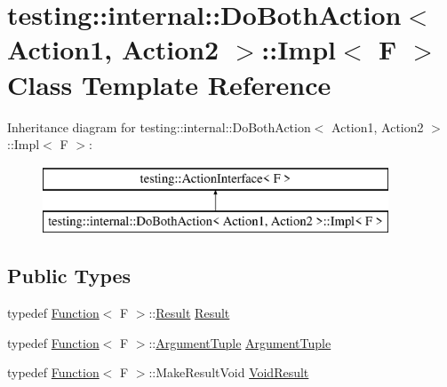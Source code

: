 \hypertarget{classtesting_1_1internal_1_1_do_both_action_1_1_impl}{}\section{testing\+::internal\+::Do\+Both\+Action$<$ Action1, Action2 $>$\+::Impl$<$ F $>$ Class Template Reference}
\label{classtesting_1_1internal_1_1_do_both_action_1_1_impl}
Inheritance diagram for testing\+::internal\+::Do\+Both\+Action$<$ Action1, Action2 $>$\+::Impl$<$ F $>$\+:\begin{figure}[H]
\begin{center}
\leavevmode
\includegraphics[height=2.000000cm]{d6/df8/classtesting_1_1internal_1_1_do_both_action_1_1_impl}
\end{center}
\end{figure}
\subsection*{Public Types}
\begin{DoxyCompactItemize}
\item 
typedef \mbox{\hyperlink{structtesting_1_1internal_1_1_function}{Function}}$<$ F $>$\+::\mbox{\hyperlink{classtesting_1_1_action_interface_a7477de2fe3e4e01c59db698203acaee7}{Result}} \mbox{\hyperlink{classtesting_1_1internal_1_1_do_both_action_1_1_impl_a90f9878e3c1db37a688b6e0c4c29c17d}{Result}}
\item 
typedef \mbox{\hyperlink{structtesting_1_1internal_1_1_function}{Function}}$<$ F $>$\+::\mbox{\hyperlink{classtesting_1_1_action_interface_af72720d864da4d606629e83edc003511}{Argument\+Tuple}} \mbox{\hyperlink{classtesting_1_1internal_1_1_do_both_action_1_1_impl_a2cd808bf132e28d3df7d59d23c19f273}{Argument\+Tuple}}
\item 
typedef \mbox{\hyperlink{structtesting_1_1internal_1_1_function}{Function}}$<$ F $>$\+::Make\+Result\+Void \mbox{\hyperlink{classtesting_1_1internal_1_1_do_both_action_1_1_impl_a83909f0d1addcd1207ff45b128f33802}{Void\+Result}}
\end{DoxyCompactItemize}
